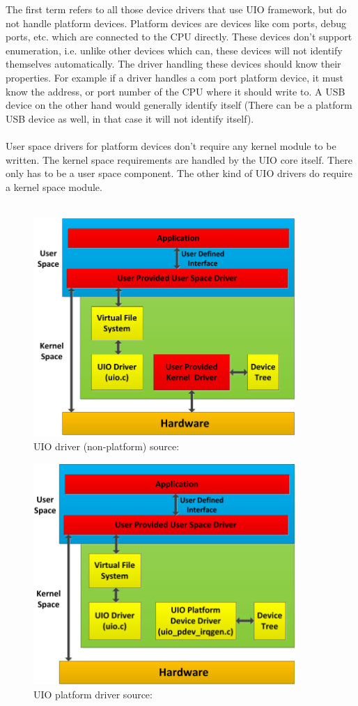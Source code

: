 \documentclass[twoside]{iitbreport}
\begin{document}
The first term refers to all those device drivers that use UIO framework, but do not handle platform devices. Platform devices are devices like com ports, debug ports, etc. which are connected to the CPU directly\cite{deviceDriverArchitectureLinux}. These devices don't support enumeration, i.e. unlike other devices which can, these devices will not identify themselves automatically. The driver handling these devices should know their properties. For example if a driver handles a com port platform device, it must know the address, or port number of the CPU where it should write to. A USB device on the other hand would generally identify itself (There can be a platform USB device as well, in that case it will not identify itself). 
\\\\
User space drivers for platform devices don't require any kernel module to be written. The kernel space requirements are handled by the UIO core itself. There only has to be a user space component. The other kind of UIO drivers do require a kernel space module.
\\\\
\begin{figure}[ht]
\centering
\includegraphics[width=375px]{uio-driver}
\caption{UIO driver (non-platform) \footnotesize{source:\cite{xilinxUIO}} \label{fig:uio-driver1}}
\end{figure}

\begin{figure}[ht]
\centering
\includegraphics[width=375px]{uio-platform}
\caption{UIO platform driver \footnotesize{source:\cite{xilinxUIO}} \label{fig:uio-platform1}}
\end{figure}
\end{document}

